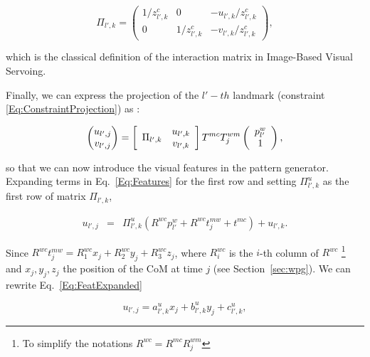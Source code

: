 \begin{equation*}
\Pi_{l',k} = \left(
\begin{matrix}
 1/z^{c}_{l',k} & 0 & - u_{l',k} / z^{c}_{l',k} \\
 0 & 1/z^{c}_{l',k} & - v_{l',k} / z^{c}_{l',k}
\end{matrix}
\right),
\end{equation*}

which is the classical definition of the interaction matrix in Image-Based Visual Servoing.

Finally, we can express the projection of the $l'-th$ landmark (constraint \ref{Eq:ConstraintProjection}) as :

\begin{equation}
\label{Eq:Features}
 \left(
 \begin{matrix}
  u_{l',j} \\
  v_{l',j}
 \end{matrix}
 \right) = 
\left[
\begin{array}{cc}
\multirow{2}{*}{$\Pi_{l',k}$} & u_{l',k} \\
& v_{l',k} \\
\end{array}
\right]
 T^{mc} T^{wm}_j \left( \begin{array}{c}
 p^{w}_{l'}\\
 1
 \end{array}\right),
\end{equation}

so that we can now introduce the visual features in the pattern generator. Expanding terms in Eq.~\ref{Eq:Features} for the first row and setting $\Pi^u_{l',k}$ as the first row of matrix $\Pi_{l',k}$,

\begin{eqnarray}
\label{Eq:FeatExpanded}
 u_{l',j} &= &\Pi^u_{l',k} (R^{wc} p^{w}_{l'} + R^{wc} t^{mw}_j + t^{mc}) + u_{l',k}.
\end{eqnarray}

Since $R^{wc} t^{mw}_j = R^{wc}_1 x_j + R^{wc}_2 y_j + R^{wc}_3 z_j$, where $R^{wc}_i$ is the $i$-th column of $R^{wc}$
\footnote{To simplify the notations $R^{wc}=R^{mc}R_j^{wm}$}
and $x_j,y_j,z_j$ the position of the CoM at time $j$ (see Section~\ref{sec:wpg}). We can rewrite Eq.~\ref{Eq:FeatExpanded}

\begin{equation}
\label{Eq:FeaturesUReduced}
 u_{l',j} = a^u_{l',k} x_j + b^u_{l',k} y_j + c^u_{l',k},
\end{equation}

